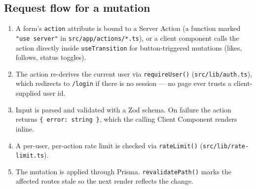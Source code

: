 \documentclass[11pt,a4paper]{article}
\begin{document}
\subsection{Request flow for a mutation}
\begin{enumerate}[leftmargin=*]
  \item A form's \texttt{action} attribute is bound to a Server Action (a function
        marked \texttt{"use server"} in \texttt{src/app/actions/*.ts}), or a client
        component calls the action directly inside \texttt{useTransition} for
        button-triggered mutations (likes, follows, status toggles).
  \item The action re-derives the current user via \texttt{requireUser()}
        (\texttt{src/lib/auth.ts}), which redirects to \texttt{/login} if there is no
        session --- no page ever trusts a client-supplied user id.
  \item Input is parsed and validated with a Zod schema. On failure the action returns
        \texttt{\{ error: string \}}, which the calling Client Component renders inline.
  \item A per-user, per-action rate limit is checked via \texttt{rateLimit()}
        (\texttt{src/lib/rate-limit.ts}).
  \item The mutation is applied through Prisma. \texttt{revalidatePath()} marks the
        affected routes stale so the next render reflects the change.
\end{enumerate}
\end{document}
